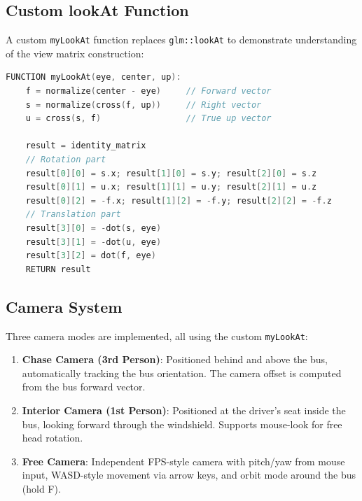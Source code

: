 \documentclass[12pt,a4paper]{article}
\begin{document}
\subsection{Custom lookAt Function}

A custom \texttt{myLookAt} function replaces \texttt{glm::lookAt} to demonstrate understanding of the view matrix construction:

\begin{lstlisting}[language=C++, caption={Custom lookAt Implementation}]
FUNCTION myLookAt(eye, center, up):
    f = normalize(center - eye)     // Forward vector
    s = normalize(cross(f, up))     // Right vector
    u = cross(s, f)                 // True up vector

    result = identity_matrix
    // Rotation part
    result[0][0] = s.x; result[1][0] = s.y; result[2][0] = s.z
    result[0][1] = u.x; result[1][1] = u.y; result[2][1] = u.z
    result[0][2] = -f.x; result[1][2] = -f.y; result[2][2] = -f.z
    // Translation part
    result[3][0] = -dot(s, eye)
    result[3][1] = -dot(u, eye)
    result[3][2] = dot(f, eye)
    RETURN result
\end{lstlisting}

\subsection{Camera System}

Three camera modes are implemented, all using the custom \texttt{myLookAt}:

\begin{enumerate}
    \item \textbf{Chase Camera (3rd Person)}: Positioned behind and above the bus, automatically tracking the bus orientation. The camera offset is computed from the bus forward vector.
    \item \textbf{Interior Camera (1st Person)}: Positioned at the driver's seat inside the bus, looking forward through the windshield. Supports mouse-look for free head rotation.
    \item \textbf{Free Camera}: Independent FPS-style camera with pitch/yaw from mouse input, WASD-style movement via arrow keys, and orbit mode around the bus (hold F).
\end{enumerate}
\end{document}
